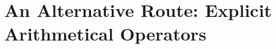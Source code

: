 \documentclass[12pt,oneside,reqno]{amsart}
\newtheorem{theorem}{Theorem}
\theoremstyle{definition}
\begin{document}





\section{An Alternative Route: Explicit Arithmetical Operators} \label{section:explicitarithmetic}
\end{document}
